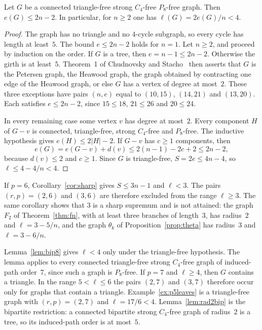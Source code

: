 \documentclass[ASNA]{USG}
\theoremstyle{WBstyletwo}
\numberwithin{equation}{section}
\newcommand{\lr}{\ell}
\newcommand{\pp}{p}
\begin{document}
\begin{lemma}\label{lem:bip8}
Let $G$ be a connected triangle-free strong $C_4$-free $P_8$-free graph. Then $e(G)\le 2n-2$. In particular, for $n\ge 2$ one has $\lr(G)=2e(G)/n<4$.
\end{lemma}

\begin{proof}
The graph has no triangle and no $4$-cycle subgraph, so every cycle has length at least~$5$. The bound $e\le 2n-2$ holds for $n=1$. Let $n\ge 2$, and proceed by induction on the order. If $G$ is a tree, then $e=n-1\le 2n-2$. Otherwise the girth is at least~$5$. Theorem~1 of Chudnovsky and Stacho~\cite{chudstacho} then asserts that $G$ is the Petersen graph, the Heawood graph, the graph obtained by contracting one edge of the Heawood graph, or else $G$ has a vertex of degree at most~$2$. These three exceptions have pairs $(n,e)$ equal to $(10,15)$, $(14,21)$ and $(13,20)$. Each satisfies $e\le 2n-2$, since $15\le 18$, $21\le 26$ and $20\le 24$.

In every remaining case some vertex $v$ has degree at most~$2$. Every component $H$ of $G-v$ is connected, triangle-free, strong $C_4$-free and $P_8$-free. The inductive hypothesis gives $e(H)\le 2|H|-2$. If $G-v$ has $c\ge 1$ components, then
\[
e(G)=e(G-v)+d(v)\le 2(n-1)-2c+2\le 2n-2,
\]
because $d(v)\le 2$ and $c\ge 1$. Since $G$ is triangle-free, $S=2e\le 4n-4$, so $\lr\le 4-4/n<4$.
\end{proof}

If $\pp=6$, Corollary~\ref{cor:sharp} gives $S\le 3n-1$ and $\lr<3$. The pairs $(r,\pp)=(2,6)$ and $(3,6)$ are therefore excluded from the range $\lr\ge 3$. The same corollary shows that $3$ is a sharp supremum and is not attained: the graph $F_2$ of Theorem~\ref{thm:fn}, with at least three branches of length~$3$, has radius~$2$ and $\lr=3-5/n$, and the graph $\theta_k$ of Proposition~\ref{prop:theta} has radius~$3$ and $\lr=3-6/n$.

Lemma~\ref{lem:bip8} gives $\lr<4$ only under the triangle-free hypothesis. The lemma applies to every connected triangle-free strong $C_4$-free graph of induced-path order~$7$, since such a graph is $P_8$-free. If $\pp=7$ and $\lr\ge 4$, then $G$ contains a triangle. In the range $5<\lr\le 6$ the pairs $(2,7)$ and $(3,7)$ therefore occur only for graphs that contain a triangle. Example~\ref{ex:p5leaves} is a triangle-free graph with $(r,\pp)=(2,7)$ and $\lr=17/6<4$. Lemma~\ref{lem:rad2bip} is the bipartite restriction: a connected bipartite strong $C_4$-free graph of radius~$2$ is a tree, so its induced-path order is at most~$5$.
\end{document}
